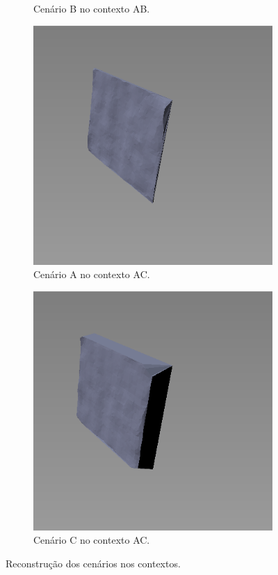 \begin{figure}[H]
\begin{subfigure}[t]{0.33\textwidth}
        \caption{Cenário B no contexto AB.}
    \end{subfigure}
    \begin{subfigure}[t]{0.33\textwidth}
        \includegraphics[width=\textwidth]{dados/figuras/AB1.png}
        \caption{Cenário A no contexto AC.}
    \end{subfigure}
    \hspace{1em}
    \begin{subfigure}[t]{0.33\textwidth}
        \includegraphics[width=\textwidth]{dados/figuras/AB2.png}
        \caption{Cenário C no contexto AC.}
    \end{subfigure}
    \caption{Reconstrução dos cenários nos contextos.}
    \label{fig:recontrucao_virtual_contextos}
\end{figure}


